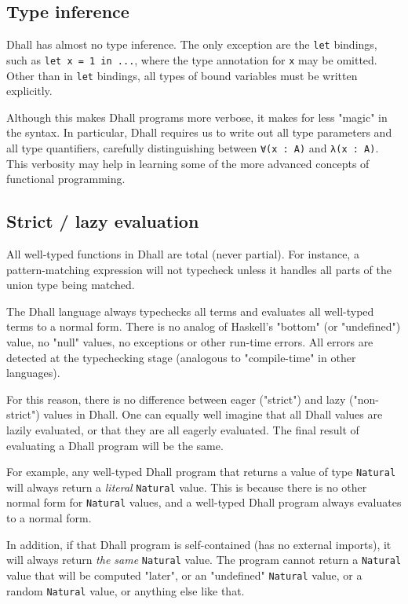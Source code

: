 \subsection{Type inference}


Dhall has almost no type inference.
The only exception are the \lstinline!let! bindings, such as \lstinline!let x = 1 in ...!, where the type annotation for \lstinline!x! may be omitted.
Other than in \lstinline!let! bindings, all types of bound variables must be written explicitly.


Although this makes Dhall programs more verbose, it makes for less "magic" in the syntax.
In particular, Dhall requires us to write out all type parameters and all type quantifiers, carefully distinguishing between \lstinline!∀(x : A)! and \lstinline!λ(x : A)!.
This verbosity may help in learning some of the more advanced concepts of functional programming.


\subsection{Strict / lazy evaluation}


All well-typed functions in Dhall are total (never partial).
For instance, a pattern-matching expression will not typecheck unless it handles all parts of the union type being matched.


The Dhall language always typechecks all terms and evaluates all well-typed terms to a normal form.
There is no analog of Haskell's "bottom" (or "undefined") value, no "null" values, no exceptions or other run-time errors.
All errors are detected at the typechecking stage (analogous to "compile-time" in other languages).


For this reason, there is no difference between eager ("strict") and lazy ("non-strict") values in Dhall.
One can equally well imagine that all Dhall values are lazily evaluated, or that they are all eagerly evaluated.
The final result of evaluating a Dhall program will be the same. 


For example, any well-typed Dhall program that returns a value of type \lstinline!Natural! will always return a \emph{literal} \lstinline!Natural! value.
This is because there is no other normal form for \lstinline!Natural! values, and a well-typed Dhall program always evaluates to a normal form.


In addition, if that Dhall program is self-contained (has no external imports), it will always return \emph{the same} \lstinline!Natural! value.
The program cannot return a \lstinline!Natural! value that will be computed "later", or an "undefined" \lstinline!Natural! value, or a random \lstinline!Natural! value, or anything else like that. 


